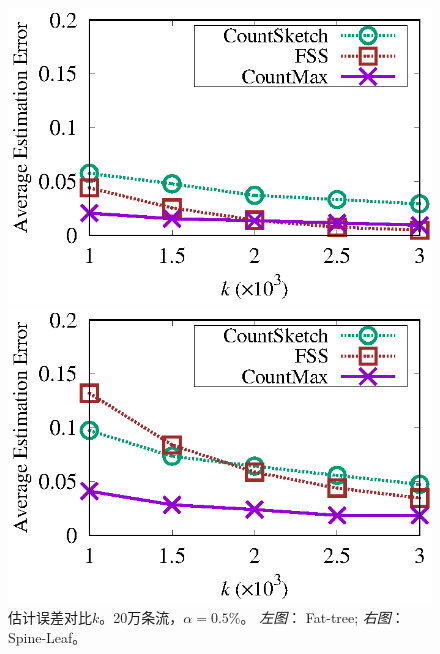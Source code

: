 \begin{figure}[!t]
	\centering
	\begin{minipage}[t]{0.49\linewidth}
		\centering
		\includegraphics[width=\linewidth]{fig/ft_k_appr_200000_095.eps}
	\end{minipage}\vspace{-0.6em}%
	\begin{minipage}[t]{0.49\linewidth}
		\centering
		\includegraphics[width=\linewidth]{fig/hy_k_appr_200000_095.eps}
	\end{minipage} \vspace{-0.6em}%
	\caption{\textnormal{估计误差对比$k$。20万条流，$\alpha = 0.5\%$。 \textit{左图}： Fat-tree; \textit{右图}： Spine-Leaf。}}
	\label{fig:acc,k,20,5}
\end{figure}


